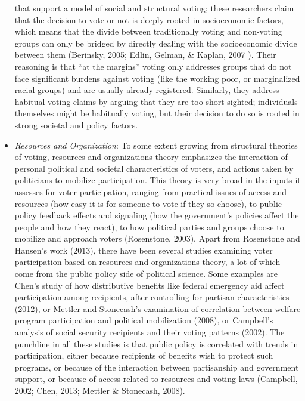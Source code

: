 \documentclass[12pt,twoside]{reedthesis}
\begin{document}
\begin{itemize}
    that support a model of social and structural voting; these
    researchers claim that the decision to vote or not is deeply rooted in
    socioeconomic factors, which means that the divide between
    traditionally voting and non-voting groups can only be bridged by
    directly dealing with the socioeconomic divide between them (Berinsky,
    2005; Edlin, Gelman, \& Kaplan, 2007 ). Their reasoning is that ``at
    the margins'' voting only addresses groups that do not face
    significant burdens against voting (like the working poor, or
    marginalized racial groups) and are usually already registered.
    Similarly, they address habitual voting claims by arguing that they
    are too short-sighted; individuals themselves might be habitually
    voting, but their decision to do so is rooted in strong societal and
    policy factors.
  \item
    \emph{Resources and Organization}: To some extent growing from
    structural theories of voting, resources and organizations theory
    emphasizes the interaction of personal political and societal
    characteristics of voters, and actions taken by politicians to
    mobilize participation. This theory is very broad in the inputs it
    assesses for voter participation, ranging from practical issues of
    access and resources (how easy it is for someone to vote if they so
    choose), to public policy feedback effects and signaling (how the
    government's policies affect the people and how they react), to how
    political parties and groups choose to mobilize and approach voters
    (Rosenstone, 2003). Apart from Rosenstone and Hansen's work (2013),
    there have been several studies examining voter participation based on
    resources and organizations theory, a lot of which come from the
    public policy side of political science. Some examples are Chen's
    study of how distributive benefits like federal emergency aid affect
    participation among recipients, after controlling for partisan
    characteristics (2012), or Mettler and Stonecash's examination of
    correlation between welfare program participation and political
    mobilization (2008), or Campbell's analysis of social security
    recipients and their voting patterns (2002). The punchline in all
    these studies is that public policy is correlated with trends in
    participation, either because recipients of benefits wish to protect
    such programs, or because of the interaction between partisanship and
    government support, or because of access related to resources and
    voting laws (Campbell, 2002; Chen, 2013; Mettler \& Stonecash, 2008).
  \end{itemize}
  
\end{document}
